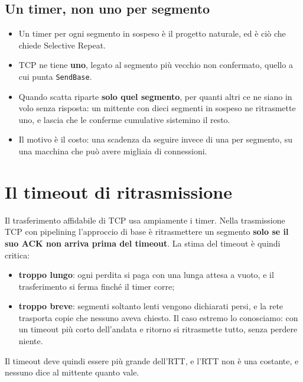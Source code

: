 \subsection{Un timer, non uno per segmento}

\begin{itemize}
    \item Un timer per ogni segmento in sospeso è il progetto naturale, ed è ciò che chiede Selective Repeat.
    \item TCP ne tiene \textbf{uno}, legato al segmento più vecchio non confermato, quello a cui punta \texttt{SendBase}.
    \item Quando scatta riparte \textbf{solo quel segmento}, per quanti altri ce ne siano in volo senza risposta: un mittente
          con dieci segmenti in sospeso ne ritrasmette uno, e lascia che le conferme cumulative sistemino il resto.
    \item Il motivo è il costo: una scadenza da seguire invece di una per segmento, su una macchina che può avere migliaia
          di connessioni.
\end{itemize}

\section{Il timeout di ritrasmissione}

Il trasferimento affidabile di TCP usa ampiamente i timer. Nella trasmissione TCP con pipelining
l'approccio di base è ritrasmettere un segmento \textbf{solo se il suo ACK non arriva prima del timeout}.
La stima del timeout è quindi critica:

\begin{itemize}
    \item \textbf{troppo lungo}: ogni perdita si paga con una lunga attesa a vuoto, e il trasferimento si ferma finché il
          timer corre;
    \item \textbf{troppo breve}: segmenti soltanto lenti vengono dichiarati persi, e la rete trasporta copie che nessuno
          aveva chiesto. Il caso estremo lo conosciamo: con un timeout più corto dell'andata e ritorno si ritrasmette tutto,
          senza perdere niente.
\end{itemize}
Il timeout deve quindi essere più grande dell'RTT, e l'RTT non è una costante, e nessuno dice al mittente quanto vale.

